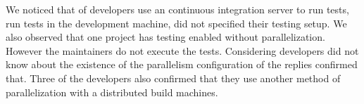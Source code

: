 We noticed that \pctEmailsCI{} of developers use an continuous integration 
server to run tests, \pctEmailsLocal{} run tests in the
development machine, \pctEmailsDidNotSpecify{} did not specified their
testing setup. We also observed that one project has testing enabled 
without parallelization. However the maintainers do not execute the tests.
Considering developers did not know about the existence of the
parallelism configuration \pctEmailsDoNotKnow{} of the replies
confirmed that. Three of the developers also confirmed that they use
another method of parallelization with a distributed build machines.

\begin{center}
\end{center}



